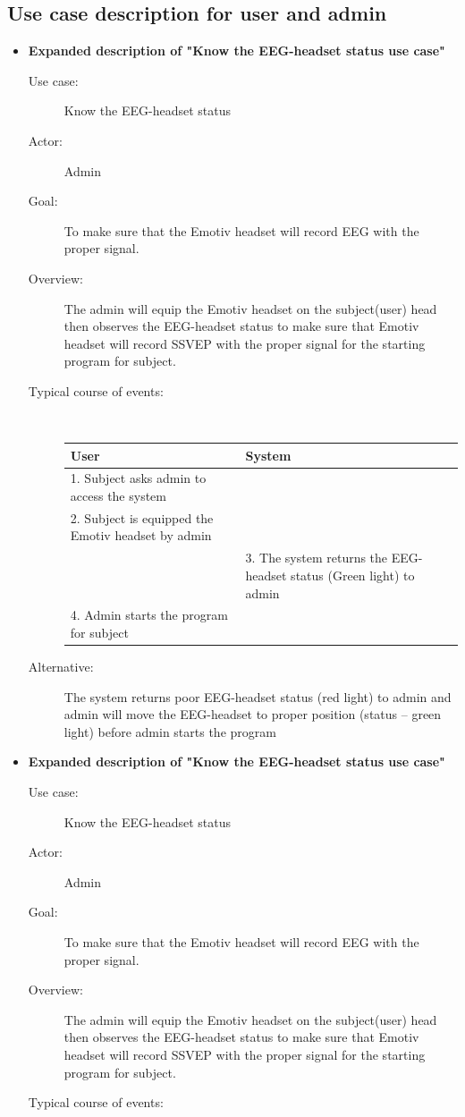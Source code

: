\subsection{Use case description for user and admin}
\begin{itemize}
\item \textbf{Expanded description of "Know the EEG-headset status
use case" }

\begin{description}
\item [{Use case:}] Know the EEG-headset status 
\item [{Actor:}] Admin 
\item [{Goal:}] To make sure that the Emotiv headset will record EEG with
the proper signal. 
\item [{Overview:}] The admin will equip the Emotiv headset on the subject(user)
head then observes the EEG-headset status to make sure that Emotiv
headset will record SSVEP with the proper signal for the starting
program for subject. 
\item [{Typical course of events:}]~

{
	\centering

	\begin{tabular}{| m{.47\linewidth} | m{.47\linewidth} |}
		
	\hline 
	\textbf{User} & \textbf{System}  \\
	\hline 
	1. Subject asks admin to access the system &   \\
	\hline 
	2. Subject is equipped the Emotiv headset by admin  &   \\
	\hline 
	& 3. The system returns the EEG-headset status (Green light) to admin \\
	\hline 
	4. Admin starts the program for subject & \\
	\hline 
	
	\end{tabular}
}
\item[Alternative:] The system returns poor EEG-headset status (red light) to admin and admin will move the EEG-headset to proper position (status – green light) before admin starts the program 

\end{description}
\item \textbf{Expanded description of "Know the EEG-headset status
	use case" }

\begin{description}
	\item [{Use case:}] Know the EEG-headset status 
	\item [{Actor:}] Admin 
	\item [{Goal:}] To make sure that the Emotiv headset will record EEG with
	the proper signal. 
	\item [{Overview:}] The admin will equip the Emotiv headset on the subject(user)
	head then observes the EEG-headset status to make sure that Emotiv
	headset will record SSVEP with the proper signal for the starting
	program for subject. 
	\item [{Typical course of events:}]~
	

\end{description}
\end{itemize}
